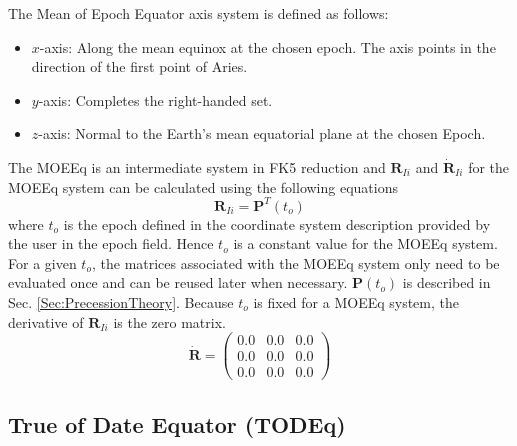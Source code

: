 {The Mean of Epoch Equator axis system is defined as follows:
%
\begin{itemize}
\item $x$-axis:  Along the mean equinox at the chosen epoch.
                 The axis points in the direction of the
                 first point of Aries.
%
\item $y$-axis:  Completes the right-handed set.
%
\item $z$-axis:  Normal to the Earth's mean equatorial plane at the chosen Epoch.
\end{itemize}
%
The MOEEq is an intermediate system in FK5 reduction and
$\mathbf{R}_{Ii}$ and $ \dot{\mathbf{R}}_{Ii}$ for the MOEEq system
can be calculated using the following equations
%
\begin{equation}
      \mathbf{R}_{Ii} = \mathbf{P}^T(t_o)
\end{equation}
%
where $t_o$ is the epoch defined in the coordinate system
description provided by the user in the epoch field.  Hence $t_o$ is
a constant value for the MOEEq system.  For a given $t_o$, the
matrices associated with the MOEEq system only need to be evaluated
once and can be reused later when necessary. $\mathbf{P}(t_o)$ is
described in Sec. \ref{Sec:PrecessionTheory}. Because $t_o$ is fixed
for a MOEEq system, the derivative of $\mathbf{R}_{Ii}$ is the zero
matrix.
%
\begin{equation}
  \dot{\mathbf{R}} =   \begin{pmatrix}
     0.0 & 0.0 & 0.0\\
     0.0 & 0.0 & 0.0\\
     0.0 & 0.0 & 0.0
     \end{pmatrix}
\end{equation}

\subsection{True of Date Equator (TODEq)}
\label{Sec:TODEq} 

}

